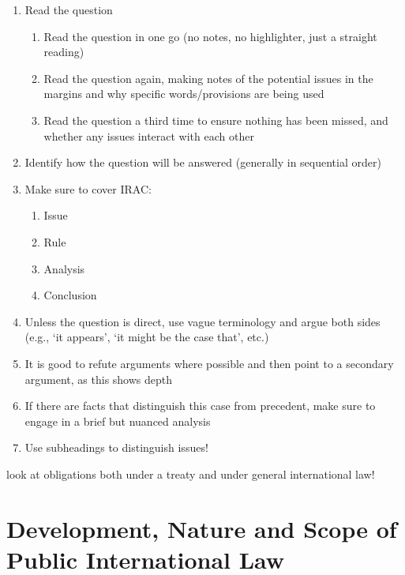 \begin{tcolorbox}[title = How to Answer a Problem Question]
    \flushleft
    \begin{enumerate}
        \item Read the question
        \begin{enumerate}
            \item Read the question in one go (no notes, no highlighter, just a straight reading)
            \item Read the question again, making notes of the potential issues in the margins and why specific words/provisions are being used
            \item Read the question a third time to ensure nothing has been missed, and whether any issues interact with each other
        \end{enumerate}
        \item Identify how the question will be answered (generally in sequential order)
        \item Make sure to cover IRAC:
        \begin{enumerate}
            \item Issue
            \item Rule
            \item Analysis
            \item Conclusion
        \end{enumerate}
        \item Unless the question is direct, use vague terminology and argue both sides (e.g., `it appears', `it might be the case that', etc.)
        \item It is good to refute arguments where possible and then point to a secondary argument, as this shows depth
        \item If there are facts that distinguish this case from precedent, make sure to engage in a brief but nuanced analysis
        \item Use subheadings to distinguish issues!
    \end{enumerate}
    look at obligations both under a treaty and under general international law!
\end{tcolorbox}

\section{Development, Nature and Scope of Public International Law}

